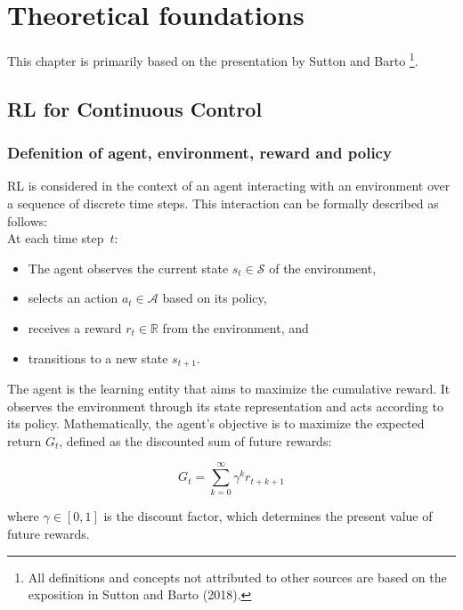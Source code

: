 
\section{Theoretical foundations}

This chapter is primarily based on the presentation by Sutton and Barto \cite{Sutton2018}\footnote{All definitions and concepts not attributed to other sources are based on the exposition in Sutton and Barto (2018).}.

\subsection{RL for Continuous Control}

\subsubsection{Defenition of agent, environment, reward and policy}

RL is considered in the context of an agent interacting with an environment over a sequence of discrete time steps. This interaction can be formally described as follows:\\

\noindent At each time step~$t$:
\begin{itemize}
    \item The agent observes the current state $s_t \in \mathcal{S}$ of the environment,
    \item selects an action $a_t \in \mathcal{A}$ based on its policy,
    \item receives a reward $r_t \in \mathbb{R}$ from the environment, and
    \item transitions to a new state $s_{t+1}$.
\end{itemize}

\noindent The agent is the learning entity that aims to maximize the cumulative reward. It observes the environment through its state representation and acts according to its policy. Mathematically, the agent's objective is to maximize the expected return $G_t$, defined as the discounted sum of future rewards:

\begin{equation}
G_t = \sum_{k=0}^{\infty} \gamma^k r_{t+k+1}
\end{equation}

\noindent where $\gamma \in [0,1]$ is the discount factor, which determines the present value of future rewards.\\

